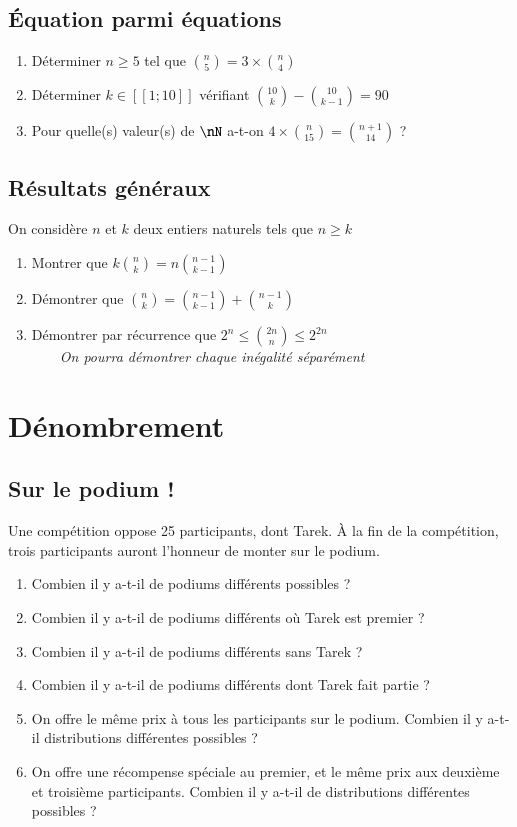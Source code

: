\documentclass[oneside,12pt]{article}          %
\begin{document}
\subsection{Équation parmi équations}
\begin{enumerate}
    \item Déterminer $n\geq5$ tel que $\binom{n}{5}=3\times\binom{n}{4}$
    \item Déterminer $k\in[\![1;10]\!]$ vérifiant $\binom{10}{k}-\binom{10}{k-1}=90$
    \item Pour quelle(s) valeur(s) de $\nN$ a-t-on $4\times\binom{n}{15}=\binom{n+1}{14}$ ?
\end{enumerate}



\subsection{Résultats généraux}
On considère $n$ et $k$ deux entiers naturels tels que $n\geq k$
\begin{enumerate}
    \item Montrer que $k\binom{n}{k}=n\binom{n-1}{k-1}$
    \item Démontrer que $\binom{n}{k}=\binom{n-1}{k-1}+\binom{n-1}{k}$
    \item Démontrer par récurrence que $2^n\leq\binom{2n}{n}\leq2^{2n}$\\
    ~~~~\textit{On pourra démontrer chaque inégalité séparément}
\end{enumerate}



\section{Dénombrement}

\subsection{Sur le podium !}
Une compétition oppose 25 participants, dont Tarek. À la fin de la compétition, trois participants auront l'honneur de monter sur le podium.
\begin{enumerate}
    \item Combien il y a-t-il de podiums différents possibles ?
    \item Combien il y a-t-il de podiums différents où Tarek est premier ?
    \item Combien il y a-t-il de podiums différents sans Tarek ?
    \item Combien il y a-t-il de podiums différents dont Tarek fait partie ?
    \item On offre le même prix à tous les participants sur le podium. Combien il y a-t-il distributions différentes possibles ?
    \item On offre une récompense spéciale au premier, et le même prix aux deuxième et troisième participants. Combien il y a-t-il de distributions différentes possibles ?
\end{enumerate}
\end{document}
